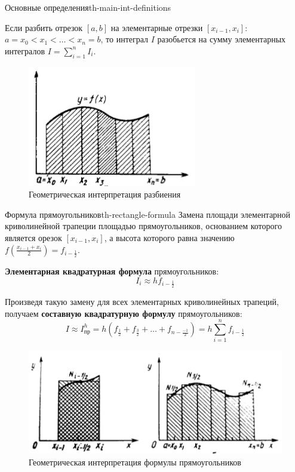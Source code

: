 \documentclass[14pt]{extarticle}
\begin{document}
\begin{definition}{Основные определения}{th-main-int-definitions}
        \vspace{\baselineskip}

        Если разбить отрезок $[a, b]$ на элементарные отрезки $[x_{i - 1}, x_{i}]$: $a = x_{0} < x_{1} < \ldots < x_{n} = b$, то интеграл $I$ разобьется на сумму элементарных интегралов $I = \sum_{i = 1}^{n} I_{i}$.

        \begin{figure}[H]
            \centering
            \includegraphics[scale=0.7]{images/int-ex-1.png}
            \caption{Геометрическая интерпретация разбиения}
            \label{fig:int-interpretation-1}
        \end{figure}
    \end{definition}

    \begin{theorem}{Формула прямоугольников}{th-rectangle-formula}
        Замена площади элементарной криволинейной трапеции площадью прямоугольников, основанием которого является орезок $[x_{i-1}, x_{i}]$, а высота которого равна значению $f(\frac{x_{i - 1} + x_{i}}{2}) = f_{i - \frac{1}{2}}$.

        \vspace{\baselineskip}

        \textbf{Элементарная квадратурная формула} прямоугольников:
        $$I_{i} \approx hf_{i - \frac{1}{2}}$$

        Произведя такую замену для всех элементарных криволинейных трапеций, получаем \textbf{составную квадратурную формулу} прямоугольников:
        $$I \approx I_{\text{пр}}^{h} = h(f_{\frac{1}{2}} + f_{\frac{3}{2}} + \ldots + f_{n - \frac{ - 1}{2}}) = h\sum_{i = 1}^{n} f_{i - \frac{1}{2}}$$
    
        \begin{figure}[H]
            \centering
            \includegraphics[scale=0.7]{images/int-rectangle-ex.png}
            \caption{Геометрическая интерпретация формулы прямоугольников}
            \label{fig:int-rectangle-ex}
        \end{figure}
    \end{theorem}
\end{document}
